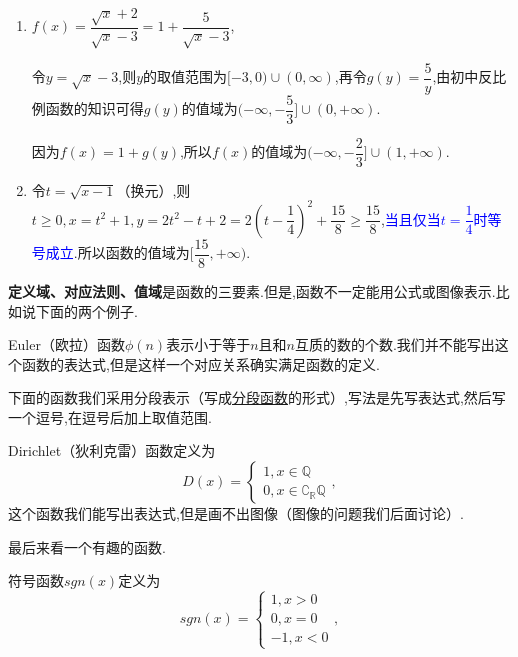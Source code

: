 \documentclass[lang=cn,math=cm,chinesefont=nofont,11pt,scheme=chinese,twocol]{elegantbook}
\begin{document}
\begin{solution}
  \begin{enumerate}
    \item $f(x)=\dfrac{\sqrt{x}+2}{\sqrt{x}-3}=1+\dfrac{5}{\sqrt{x}-3}$,
    
    令$y=\sqrt{x}-3$,则$y$的取值范围为$[-3,0)\cup (0,\infty)$,再令$g(y)=\dfrac{5}{y}$,由初中反比例函数的知识可得$g(y)$的值域为$(-\infty,-\dfrac{5}{3}]\cup (0,+\infty)$.

    因为$f(x)=1+g(y)$,所以$f(x)$的值域为$(-\infty,-\dfrac{2}{3}]\cup (1,+\infty)$.

    \item 令$t=\sqrt{x-1}$（换元）,则$t\geqslant 0,x=t^2+1,y=2t^2-t+2=2(t-\dfrac{1}{4})^2+\dfrac{15}{8}\geqslant\dfrac{15}{8}$,\textcolor{blue}{当且仅当$t=\dfrac{1}{4}$时等号成立}.所以函数的值域为$[\dfrac{15}{8},+\infty).$
  \end{enumerate}
\end{solution}

\begin{spacing}{1.5}
  \textbf{定义域、对应法则、值域}是函数的三要素.但是,函数不一定能用公式或图像表示.比如说下面的两个例子.
\end{spacing}

\begin{example}
  Euler（欧拉）函数$\phi (n)$表示小于等于$n$且和$n$互质的数的个数.我们并不能写出这个函数的表达式,但是这样一个对应关系确实满足函数的定义.
\end{example}

下面的函数我们采用分段表示（写成\underline{分段函数}的形式）,写法是先写表达式,然后写一个逗号,在逗号后加上取值范围.

\begin{example}
  Dirichlet（狄利克雷）函数定义为
  $$D(x)=
  \begin{cases}
    1,x\in\mathbb{Q}
    \\0,x\in\complement_{\mathbb{R}}\mathbb{Q}
  \end{cases},$$
  这个函数我们能写出表达式,但是画不出图像（图像的问题我们后面讨论）.
\end{example}

最后来看一个有趣的函数.

\begin{example}
  符号函数$sgn(x)$定义为
  $$sgn(x)=
  \begin{cases}
    1,x>0
    \\0,x=0
    \\-1,x<0
  \end{cases},$$
\end{example}
\end{document}
